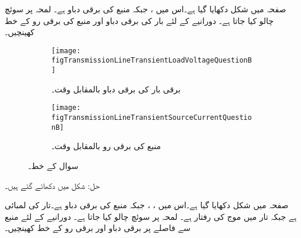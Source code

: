 صفحہ  میں شکل  دکھایا گیا ہے۔اس میں ،
  جبکہ منبع کی برقی دباو  ہے۔ لمحہ  پر سوئچ چالو کیا جاتا ہے۔ دورانیے کے لئے بار کی برقی دباو اور  منبع کی برقی رو کے خط کھینچیں۔

\begin{figure}
\centering
\begin{subfigure}{0.8\textwidth}
\centering
\texttt{[image: figTransmissionLineTransientLoadVoltageQuestionB]}
\caption{ برقی بار کی برقی دباو بالمقابل وقت۔}
\label{شکل_ترسیلی_جواب_سوال_ب}
\end{subfigure}%

\begin{subfigure}{0.8\textwidth}
\centering
\texttt{[image: figTransmissionLineTransientSourceCurrentQuestionB]}
\caption{منبع کی برقی رو بالمقابل وقت۔}
\label{شکل_ترسیلی_جواب_منبع_رو_سوال_ب}
\end{subfigure}%
\caption{سوال  کے خط۔}
\label{شکل_سوال_ترسیلی_سوال_ب}
\end{figure}
حل: شکل   میں دکھائے گئے ہیں۔


صفحہ  میں شکل  دکھایا گیا ہے۔اس میں ،
 ،   جبکہ منبع کی برقی دباو  ہے۔تار کی لمبائی  ہے جبکہ تار میں موج کی رفتار  ہے۔ لمحہ  پر سوئچ چالو کیا جاتا ہے۔ دورانیے کے لئے منبع سے  فاصلے پر  برقی دباو اور برقی رو کے خط کھینچیں۔

